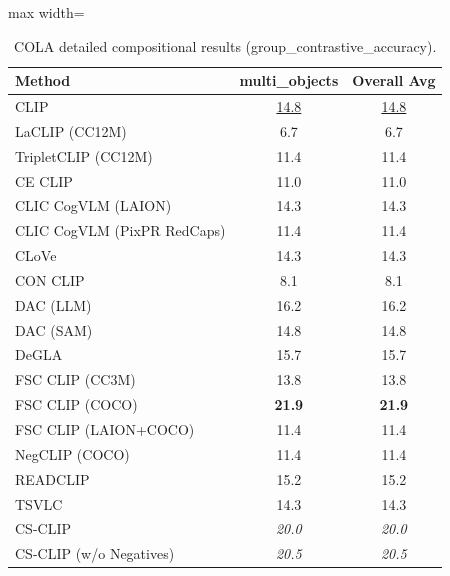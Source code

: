 \begin{table}[t]
  \centering
  \scriptsize
  \caption{COLA detailed compositional results (group_contrastive_accuracy).}
  \label{tab:COLA_detailed}
  \begin{adjustbox}{max width=\textwidth}
  \setlength{\tabcolsep}{2pt}
  \begin{tabular}{p{5cm}c|c}
    \toprule
    Method & multi\_objects & Overall Avg \\
    \midrule
    CLIP & \underline{14.8} & \underline{14.8} \\
    \midrule
    LaCLIP (CC12M) & 6.7 & 6.7 \\
    TripletCLIP (CC12M) & 11.4 & 11.4 \\
    \midrule
    CE CLIP & 11.0 & 11.0 \\
    CLIC CogVLM (LAION) & 14.3 & 14.3 \\
    CLIC CogVLM (PixPR RedCaps) & 11.4 & 11.4 \\
    CLoVe & 14.3 & 14.3 \\
    CON CLIP & 8.1 & 8.1 \\
    DAC (LLM) & 16.2 & 16.2 \\
    DAC (SAM) & 14.8 & 14.8 \\
    DeGLA & 15.7 & 15.7 \\
    FSC CLIP (CC3M) & 13.8 & 13.8 \\
    FSC CLIP (COCO) & \textbf{21.9} & \textbf{21.9} \\
    FSC CLIP (LAION+COCO) & 11.4 & 11.4 \\
    NegCLIP (COCO) & 11.4 & 11.4 \\
    READCLIP & 15.2 & 15.2 \\
    TSVLC & 14.3 & 14.3 \\
    \midrule
    CS-CLIP & \emph{20.0} & \emph{20.0} \\
    CS-CLIP (w/o Negatives) & \emph{20.5} & \emph{20.5} \\
    \bottomrule
  \end{tabular}
  \end{adjustbox}
\end{table}

